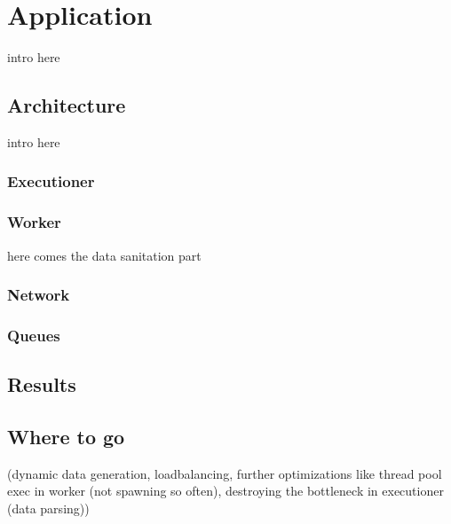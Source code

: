 \section{Application}

intro here

\subsection{Architecture}

intro here

\subsubsection{Executioner}

\subsubsection{Worker}

here comes the data sanitation part

\subsubsection{Network}

\subsubsection{Queues}


\subsection{Results}

\subsection{Where to go}

(dynamic data generation, loadbalancing, further optimizations
like thread pool exec in worker (not spawning so often),
destroying the bottleneck in executioner (data parsing))
